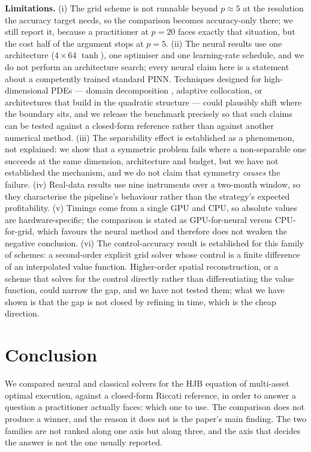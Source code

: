 \documentclass[conference]{IEEEtran}
\begin{document}
\textbf{Limitations.} (i) The grid scheme is not runnable beyond $p \approx 5$ at the resolution the
accuracy target needs, so the comparison becomes accuracy-only there; we still report it, because
a practitioner at $p=20$ faces exactly that situation, but the cost half of the argument stops at
$p=5$. (ii) The neural results use one architecture ($4\times64$ $\tanh$), one optimiser and one
learning-rate schedule, and we do not perform an architecture search; every neural claim here is a
statement about a competently trained standard PINN. Techniques designed for high-dimensional PDEs
--- domain decomposition \cite{meng2020ppinn,moseley2021finite}, adaptive collocation, or
architectures that build in the quadratic structure --- could plausibly shift where the boundary
sits, and we release the benchmark precisely so that such claims can be tested against a
closed-form reference rather than against another numerical method. (iii) The separability effect
is established as a phenomenon, not explained: we show that a symmetric problem fails where a
non-separable one succeeds at the same dimension, architecture and budget, but we have not
established the mechanism, and we do not claim that symmetry \emph{causes} the failure.
(iv) Real-data results use nine instruments over a two-month window, so they characterise the
pipeline's behaviour rather than the strategy's expected profitability. (v) Timings come from a
single GPU and CPU, so absolute values are hardware-specific; the comparison is stated as
GPU-for-neural
versus CPU-for-grid, which favours the neural method and therefore does not weaken the negative
conclusion. (vi) The control-accuracy result is established for this family of schemes: a
second-order explicit grid solver whose control is a finite difference of an interpolated value
function. Higher-order spatial reconstruction, or a scheme that solves for the control directly
rather than differentiating the value function, could narrow the gap, and we have not tested
them; what we have shown is that the gap is not closed by refining in time, which is the cheap
direction.

\section{Conclusion}

We compared neural and classical solvers for the HJB equation of multi-asset optimal execution,
against a closed-form Riccati reference, in order to answer a question a practitioner actually
faces: which one to use. The comparison does not produce a winner, and the reason it does not is
the paper's main finding. The two families are not ranked along one axis but along three, and the
axis that decides the answer is not the one usually reported.
\end{document}
